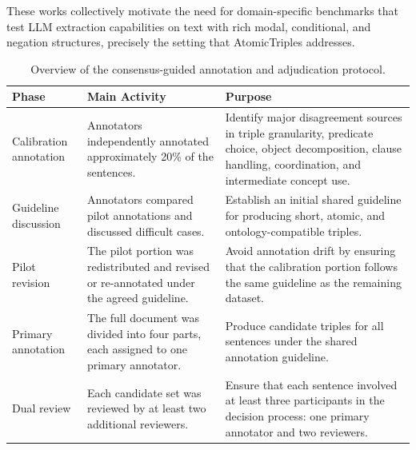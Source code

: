 \documentclass[conference]{IEEEtran}
\begin{document}
These works collectively motivate the need for domain-specific benchmarks that test LLM extraction capabilities on text with rich modal, conditional, and negation structures, precisely the setting that AtomicTriples addresses.

\begin{table}[t]
    \centering
    \caption{Overview of the consensus-guided annotation and adjudication protocol.}
    \label{tab:annotation-protocol}
    \small
    \renewcommand{\arraystretch}{1.15}

    \begin{tabularx}{\textwidth}{
        >{\raggedright\arraybackslash}p{}
        >{\raggedright\arraybackslash}p{}
        >{\raggedright\arraybackslash}X
    }
        \toprule
        \textbf{Phase} &
        \textbf{Main Activity} &
        \textbf{Purpose} \\
        \midrule

        Calibration annotation &
        Annotators independently annotated approximately 20\% of the sentences. &
        Identify major disagreement sources in triple granularity, predicate choice,
        object decomposition, clause handling, coordination, and intermediate concept use. \\

        \midrule

        Guideline discussion &
        Annotators compared pilot annotations and discussed difficult cases. &
        Establish an initial shared guideline for producing short, atomic, and
        ontology-compatible triples. \\

        \midrule

        Pilot revision &
        The pilot portion was redistributed and revised or re-annotated under the
        agreed guideline. &
        Avoid annotation drift by ensuring that the calibration portion follows the
        same guideline as the remaining dataset. \\

        \midrule

        Primary annotation &
        The full document was divided into four parts, each assigned to one primary
        annotator. &
        Produce candidate triples for all sentences under the shared annotation
        guideline. \\

        \midrule

        Dual review &
        Each candidate set was reviewed by at least two additional reviewers. &
        Ensure that each sentence involved at least three participants in the decision
        process: one primary annotator and two reviewers. \\


\end{tabularx}
\end{table}
\end{document}
